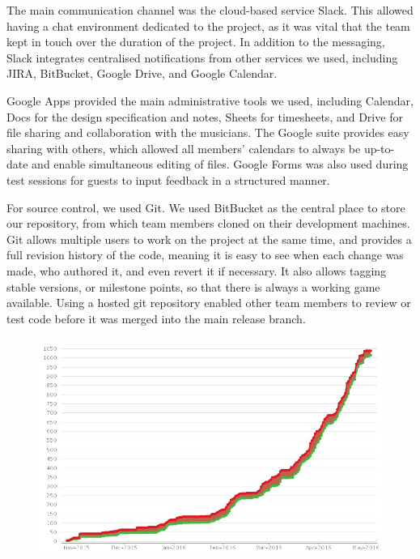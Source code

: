 \documentclass[a4paper,11pt]{article}
\begin{document}
The main communication channel was the cloud-based service Slack. This allowed having a chat environment dedicated to the project, as it was vital that the team kept in touch over the duration of the project. In addition to the messaging, Slack integrates centralised notifications from other services we used, including JIRA, BitBucket, Google Drive, and Google Calendar.

Google Apps provided the main administrative tools we used, including Calendar, Docs for the design specification and notes, Sheets for timesheets, and Drive for file sharing and collaboration with the musicians. The Google suite provides easy sharing with others, which allowed all members’ calendars to always be up-to-date and enable simultaneous editing of files. Google Forms was also used during test sessions for guests to input feedback in a structured manner.

For source control, we used Git. We used BitBucket as the central place to store our repository, from which team members cloned on their development machines. Git allows multiple users to work on the project at the same time, and provides a full revision history of the code, meaning it is easy to see when each change was made, who authored it, and even revert it if necessary. It also allows tagging stable versions, or milestone points, so that there is always a working game available. Using a hosted git repository enabled other team members to review or test code before it was merged into the main release branch.

\begin{figure}[ht]
	\centering
    \includegraphics[width=.75\textwidth]{jira_open_vs_closed}
\end{figure}
\end{document}

